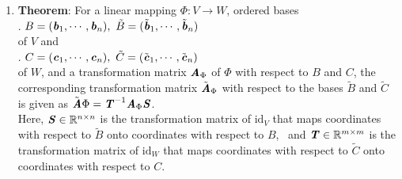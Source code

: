 \begin{enumerate}
    \item \textbf{Theorem}: For a linear mapping $\Phi : V \to W$, ordered bases
    \hfill \cite{mfml/book/mml/Deisenroth-Faisal-Ong}
    \\
    .\hfill
    $
        B = (\matname{b}_1, \cdots , \matname{b}_n), \ 
        \tilde{B} = (\tilde{\matname{b}}_1, \cdots , \tilde{\matname{b}}_n)
    $
    \hfill \cite{mfml/book/mml/Deisenroth-Faisal-Ong}
    \\
    of $V$ and
    \hfill \cite{mfml/book/mml/Deisenroth-Faisal-Ong}
    \\
    .\hfill
    $
        C = (\matname{c}_1, \cdots , \matname{c}_n), \ 
        \tilde{C} = (\tilde{\matname{c}}_1, \cdots , \tilde{\matname{c}}_n)
    $
    \hfill \cite{mfml/book/mml/Deisenroth-Faisal-Ong}
    \\
    of $W$, and a transformation matrix $\text{\textbf{\textit{A}}}_\Phi$ of $\Phi$ with respect to $B$ and $C$, the corresponding transformation matrix $\tilde{\text{\textbf{\textit{A}}}} _\Phi$ with respect to the bases $\tilde{B}$ and $\tilde{C}$ is given as
    $
        \tilde{\text{\textbf{\textit{A}}}} \Phi = \text{\textbf{\textit{T}}}^{-1}\text{\textbf{\textit{A}}}_\Phi \text{\textbf{\textit{S}}}
    $.
    \hfill \cite{mfml/book/mml/Deisenroth-Faisal-Ong}
    \\
    Here, $\text{\textbf{\textit{S}}} \in \mathbb{R}^{n\times n}$ is the transformation matrix of $\text{id}_V$ that maps coordinates with respect to $\tilde{B}$ onto coordinates with respect to $B$, \ 
    and $\text{\textbf{\textit{T}}} \in \mathbb{R}^{m\times m}$ is the transformation matrix of $\text{id}_W$ that maps coordinates with respect to $\tilde{C}$ onto coordinates with respect to $C$.
    \hfill \cite{mfml/book/mml/Deisenroth-Faisal-Ong}


\end{enumerate}
